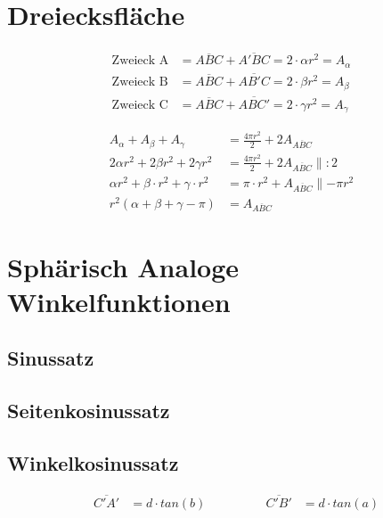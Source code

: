 \begin{refsection}
\section{Dreiecksfläche}

\begin{align*}
\text{Zweieck A}
&=
\overline{ABC} + \overline{A'BC} = 2\cdot \alpha r^{ 2 } = A_{ \alpha }\\
\text{Zweieck B}
&=
\overline{ABC} + \overline{AB'C} = 2\cdot \beta r^{ 2 } = A_{ \beta }\\
\text{Zweieck C}
&=
\overline{ABC} + \overline{ABC'} = 2\cdot \gamma r^{ 2 } = A_{ \gamma }
\end{align*}

\begin{align*}
A_{ \alpha } + A_{ \beta } + A_{ \gamma } &= \frac{ 4\pi r^{ 2 } }{ 2 } + 2A_{ \overline{ ABC }} \\
2\alpha r^{ 2 } + 2\beta r^{ 2 } + 2\gamma r^{ 2 } &= \frac{ 4\pi r^{ 2 } }{ 2 } + 2A_{ \overline{ ABC }} \parallel:2\\
\alpha r^{ 2 } + \beta \cdot r^{ 2 } + \gamma \cdot r^{ 2 } &= \pi \cdot r^{ 2 } + A_{ \overline{ ABC }} \parallel-\pi r^{ 2 }\\
r^{ 2 }\left(\alpha + \beta + \gamma - \pi\right) &= A_{ \overline{ ABC }}
\end{align*}


\section{Sphärisch Analoge Winkelfunktionen}

\subsection{Sinussatz}

\subsection{Seitenkosinussatz}

\subsection{Winkelkosinussatz}


\[
\begin{aligned}
&\overline{C'A'} &= d\cdot {tan(b)}
&
&
&
&
&
&\overline{C'B'} &= d\cdot {tan(a)}
\end{aligned}
\]


\end{refsection}
